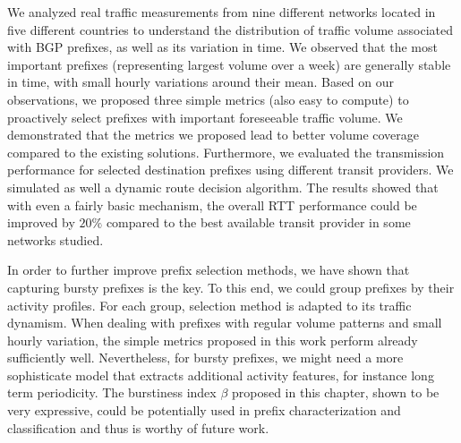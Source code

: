 We analyzed real traffic measurements from nine different networks located in five different countries to understand the distribution of traffic volume associated with BGP prefixes, as well as its variation in time.   
We observed that the most important prefixes (representing largest volume over a week) are generally stable in time, with small hourly variations around their mean. 
Based on our observations, we proposed three simple 
metrics (also easy to compute) to proactively select prefixes with important foreseeable traffic volume.
We demonstrated that the metrics we proposed lead to better volume coverage compared to the existing solutions.
Furthermore, we evaluated the transmission performance for selected destination prefixes using different transit providers. We simulated as well a dynamic route decision algorithm. 
The results showed that with even a fairly basic mechanism, the overall RTT performance could be improved by $20\%$ compared to the best available transit provider in some networks studied. 

In order to further improve prefix selection methods, we have shown that capturing bursty prefixes is the key. 
To this end, we could group prefixes by their activity profiles. 
For each group, selection method is adapted to its traffic dynamism.
When dealing with prefixes with regular volume patterns and small hourly variation, the simple metrics proposed in this work perform already sufficiently well. 
Nevertheless, for bursty prefixes, we might need a more sophisticate model that extracts additional activity features, for instance long term periodicity.
The burstiness index $\beta$ proposed in this chapter, shown to be very expressive, could be potentially used in prefix characterization and classification and thus is worthy of future work.